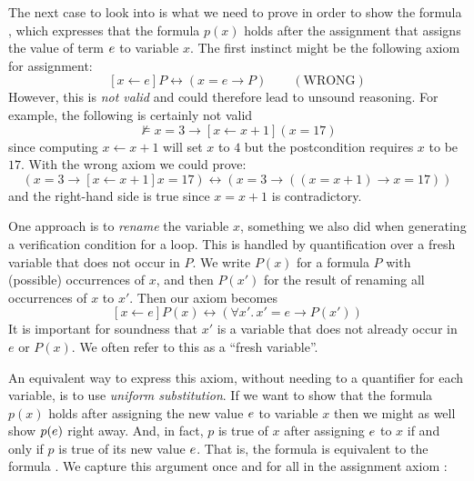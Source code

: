 \documentclass[11pt,twoside]{scrartcl}
\begin{document}
The next case to look into is what we need to prove in order to show the formula , which expresses that the formula $p(x)$ holds after the assignment  that assigns the value of term $e$ to variable $x$. The first instinct might be the following axiom for assignment:
\[
  [x \leftarrow e]P \leftrightarrow (x = e \rightarrow P) \qquad (\mbox{WRONG})
\]
However, this is \emph{not valid} and could therefore lead to unsound
reasoning. For example, the following is certainly not
valid
\[
  \not\models x = 3 \rightarrow [x \leftarrow x+1] (x = 17)
\]
since computing $x \leftarrow x+1$ will set $x$ to $4$ but the
postcondition requires $x$ to be $17$.  With the wrong axiom we could
prove:
\[
  (x = 3 \rightarrow [x \leftarrow x+1] x = 17) \leftrightarrow
  (x = 3 \rightarrow ((x = x+1) \rightarrow x = 17))
\]
and the right-hand side is true since $x = x+1$ is contradictory.

One approach is to
\emph{rename} the variable $x$, something we also did when generating
a verification condition for a loop.  This is handled by
quantification over a fresh variable that does not occur in $P$.  We
write $P(x)$ for a formula $P$ with (possible) occurrences of $x$, and
then $P(x')$ for the result of renaming all occurrences of $x$ to
$x'$.  Then our axiom becomes
\[
  [x \leftarrow e]P(x) \leftrightarrow (\forall x'.\, x' = e \rightarrow P(x'))
\]
It is important for soundness that $x'$ is a variable that does not
already occur in $e$ or $P(x)$.  We often refer to this as a ``fresh
variable''.

An equivalent way to express this axiom, without needing to a quantifier for each variable, is to use \emph{uniform substitution}.
If we want to show that the formula $p(x)$ holds after assigning the new value $e$ to variable $x$ then we might as well show $p(e)$ right away.
And, in fact, $p$ is true of $x$ after assigning $e$ to $x$ if and only if $p$ is true of its new value $e$.
That is, the formula  is equivalent to the formula .
We capture this argument once and for all in the assignment axiom :
\end{document}
